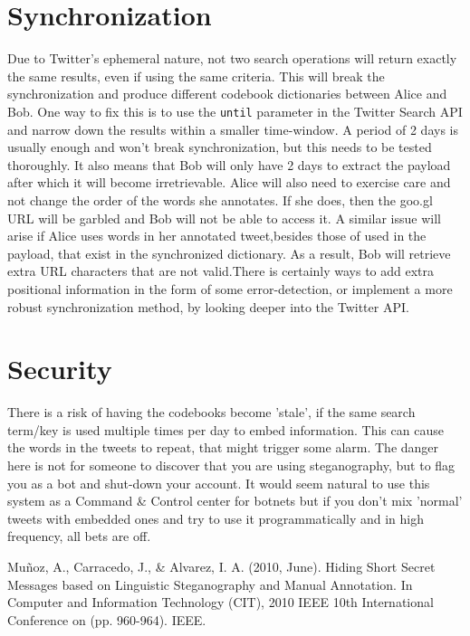 \documentclass[]{article}
\begin{document}
\section{Synchronization}
Due to Twitter's ephemeral nature, not two search operations will return exactly the same results, even if using the same criteria. This will break the synchronization and produce different codebook dictionaries between Alice and Bob. One way to fix this is to use the \texttt{until} parameter in the Twitter Search API and narrow down the results within a smaller time-window. A period of 2 days is usually enough and won't break synchronization, but this needs to be tested thoroughly. It also means that Bob will only have 2 days to extract the payload after which it will become irretrievable. \newline 
Alice will also need to exercise care and not change the order of the words she annotates. If she does, then the goo.gl URL will be garbled and Bob will not be able to access it. A similar issue will arise if Alice uses words in her annotated tweet,besides those of used in the payload, that exist in the synchronized dictionary. As a result, Bob will retrieve extra URL characters that are not valid.\newline There is certainly ways to add extra positional information in the form of some error-detection, or implement a more robust synchronization method, by looking deeper into the Twitter API.
\newpage
\section{Security}
There is a risk of having the codebooks become 'stale', if the same search term/key is used multiple times per day to embed information. This can cause the words in the tweets to repeat, that might trigger some alarm. The danger here is not for someone to discover that you are using steganography, but to flag you as a bot and shut-down your account. \newline It would seem natural to use this system as a Command \& Control center for botnets but if you don't mix 'normal' tweets with embedded ones and try to use it programmatically and in high frequency, all bets are off.



\begin{thebibliography}{1}
	Mu{\~n}oz, A., Carracedo, J., \& Alvarez, I. A. (2010, June).
	Hiding Short Secret Messages based on Linguistic Steganography and Manual
	Annotation. In Computer and Information Technology (CIT), 2010 IEEE 10th
	International Conference on (pp. 960-964). IEEE.
	
\end{thebibliography}
\end{document}
